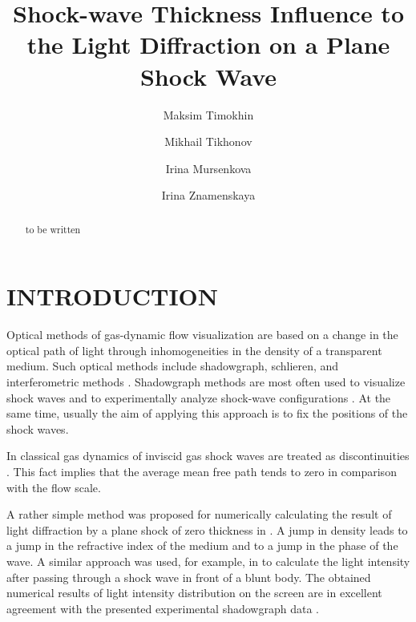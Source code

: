 \documentclass[letterpaper,11pt,oneside,reqno]{amsart}
\numberwithin{equation}{section}
\theoremstyle{definition}
\theoremstyle{qqq}
\begin{document}
\title{Shock-wave Thickness Influence to the Light Diffraction on a Plane Shock Wave}

\author{Maksim Timokhin}
\address{M. Timokhin, Lomonosov Moscow State University, 119991, Moscow, Russia and Moscow Aviation Institute, 125993, Moscow, Russia}
\author{Mikhail Tikhonov}
\address{M. TIkhonov, Lomonosov Moscow State University, 119991, Moscow, Russia}
\author{Irina Mursenkova}
\address{I. Mursenkova, Lomonosov Moscow State University, 119991, Moscow, Russia}
\author{Irina Znamenskaya}
\address{I. Znamenskaya, Lomonosov Moscow State University, 119991, Moscow, Russia}




\begin{abstract}
	to be written
\end{abstract}
\date{}

\maketitle

\setcounter{tocdepth}{3}

\section{INTRODUCTION}

Optical methods of gas-dynamic flow visualization are based on a change in the optical path of light through inhomogeneities in the density of a transparent medium. Such optical methods include shadowgraph, schlieren, and interferometric methods \cite{}. Shadowgraph methods are most often used to visualize shock waves and to experimentally analyze shock-wave configurations \cite{}. At the same time, usually the aim of applying this approach is to fix the positions of the shock waves. 

In classical gas dynamics of inviscid gas shock waves are treated as discontinuities \citep{Sedov,LANDAU1987}. This fact implies that the average mean free path tends to zero in comparison with the flow scale. 

A rather simple method was proposed for numerically calculating the result of light diffraction by a plane shock of zero thickness in \cite{Pfeifer}. A jump in density leads to a jump in the refractive index of the medium and to a jump in the phase of the wave. A similar approach was used, for example, in \cite{Panda_1995} to calculate the light intensity after passing through a shock wave in front of a blunt body. The obtained numerical results of light intensity distribution on the screen are in excellent agreement with the presented experimental shadowgraph data \cite{Pfeifer,Panda_1995}.
\end{document}
